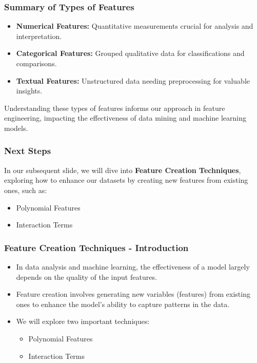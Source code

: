 \documentclass[aspectratio=169]{beamer}
\begin{document}
\begin{frame}
    \frametitle{Summary of Types of Features}
    \begin{itemize}
        \item \textbf{Numerical Features:} Quantitative measurements crucial for analysis and interpretation.
        \item \textbf{Categorical Features:} Grouped qualitative data for classifications and comparisons.
        \item \textbf{Textual Features:} Unstructured data needing preprocessing for valuable insights.
    \end{itemize}
    Understanding these types of features informs our approach in feature engineering, impacting the effectiveness of data mining and machine learning models.
\end{frame}

\begin{frame}
    \frametitle{Next Steps}
    In our subsequent slide, we will dive into \textbf{Feature Creation Techniques}, exploring how to enhance our datasets by creating new features from existing ones, such as:
    \begin{itemize}
        \item Polynomial Features
        \item Interaction Terms
    \end{itemize}
\end{frame}

\begin{frame}[fragile]
    \frametitle{Feature Creation Techniques - Introduction}
    \begin{itemize}
        \item In data analysis and machine learning, the effectiveness of a model largely depends on the quality of the input features.
        \item Feature creation involves generating new variables (features) from existing ones to enhance the model's ability to capture patterns in the data.
        \item We will explore two important techniques:
        \begin{itemize}
            \item Polynomial Features
            \item Interaction Terms
        \end{itemize}
    \end{itemize}
\end{frame}
\end{document}
